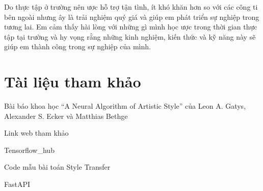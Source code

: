 \documentclass{article}
\begin{document}
\noindent 

\noindent Do thực tập ở trường n\^{e}n {\dj}ược hỗ trợ tận t\`{i}nh, \'{i}t kh\'{o} kh\u{a}n hơn so với c\'{a}c c\^{o}ng ti b\^{e}n ngo\`{a}i nhưng {\dj}\^{a}y l\`{a} trải nghiệm qu\'{y} gi\'{a} v\`{a} gi\'{u}p em ph\'{a}t triển sự nghiệp trong tương lai. Em cảm thấy h\`{a}i l\`{o}ng với những g\`{i} m\`{i}nh học {\dj}ược trong thời gian thực tập tại trường v\`{a} hy vọng rằng những kinh nghiệm, kiến thức v\`{a} kỹ n\u{a}ng n\`{a}y sẽ gi\'{u}p em th\`{a}nh c\^{o}ng trong sự nghiệp của m\`{i}nh.

\noindent 


\section{ T\`{a}i liệu tham khảo }

\noindent 

\noindent [2] B\`{a}i b\'{a}o khoa học ``A Neural Algorithm of Artistic Style'' của Leon A. Gatys, Alexander S. Ecker v\`{a} Matthias Bethge 

\noindent 

\noindent Link web tham khảo

\noindent 

\noindent [1] Tensorflow\_hub

\noindent 

\noindent [3] Code mẫu b\`{a}i to\'{a}n Style Transfer

\noindent 

\noindent [4] FastAPI

\noindent 
\end{document}
